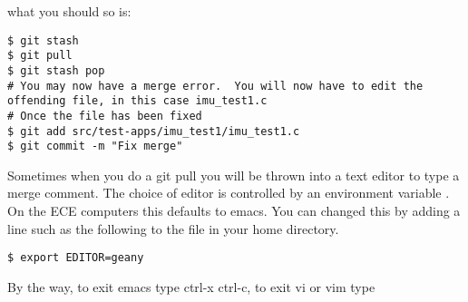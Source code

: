 what you should so is:

\begin{verbatim}
$ git stash
$ git pull
$ git stash pop
# You may now have a merge error.  You will now have to edit the offending file, in this case imu_test1.c
# Once the file has been fixed
$ git add src/test-apps/imu_test1/imu_test1.c
$ git commit -m "Fix merge"
\end{verbatim}

Sometimes when you do a git pull you will be thrown into a text editor
to type a merge comment. The choice of editor is controlled by an
environment variable . On the ECE computers this defaults
to emacs. You can changed this by adding a line such as the following to
the  file in your home directory.

\begin{verbatim}
$ export EDITOR=geany
\end{verbatim}

By the way, to exit emacs type ctrl-x ctrl-c, to exit vi or vim type 
